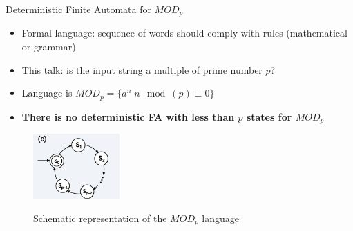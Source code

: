 \documentclass[aspectratio=169,9pt]{beamer}
\begin{document}
\begin{frame}[t]{Deterministic Finite Automata for $MOD_p$}
  \begin{itemize}
    \item Formal language: sequence of words should comply with rules (mathematical or grammar)
    \item This talk: is the input string a multiple of prime number $p$?
    \item Language is $MOD_p=\{a^n|n \mod(p)\equiv 0\}$  
    \item \textbf{There is no deterministic FA with less than $p$ states for $MOD_p$}
  \end{itemize}
  \vspace*{2em}
  \begin{figure}
    \centering
      \includegraphics[width=0.3\textwidth]{QFA_MODn.png}\\
      \caption*{Schematic representation of the $MOD_p$ language}
  \end{figure}
\end{frame}
\end{document}
